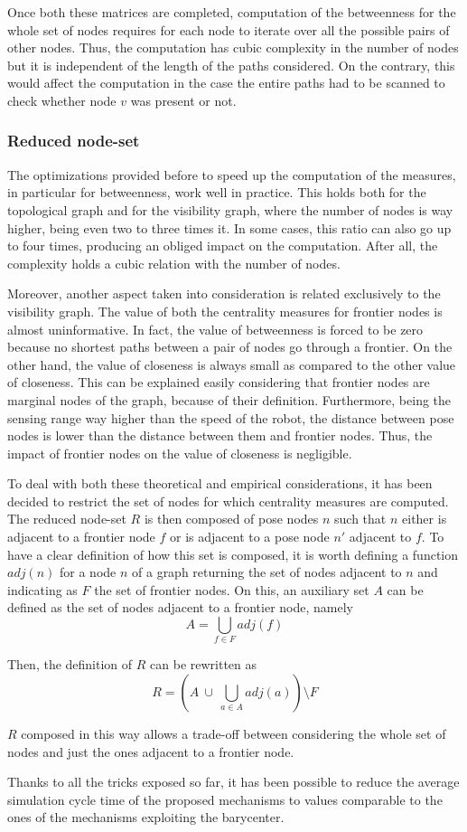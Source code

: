 Once both these matrices are completed, computation of the betweenness
for the whole set of nodes requires for each node to iterate over
all the possible pairs of other nodes. Thus, the computation has cubic
complexity in the number of nodes but it is independent of the length
of the paths considered. On the contrary, this would affect the computation
in the case the entire paths had to be scanned to check whether node
$v$ was present or not.

\subsubsection{Reduced node-set}

The optimizations provided before to speed up the computation of the
measures, in particular for betweenness, work well in practice. This
holds both for the topological graph and for the visibility graph,
where the number of nodes is way higher, being even two to three times
it. In some cases, this ratio can also go up to four times, producing
an obliged impact on the computation. After all, the complexity holds
a cubic relation with the number of nodes. 

Moreover, another aspect taken into consideration is related exclusively
to the visibility graph. The value of both the centrality measures
for frontier nodes is almost uninformative. In fact, the value of
betweenness is forced to be zero because no shortest paths between
a pair of nodes go through a frontier. On the other hand, the value
of closeness is always small as compared to the other value of closeness.
This can be explained easily considering that frontier nodes are marginal
nodes of the graph, because of their definition. Furthermore, being
the sensing range way higher than the speed of the robot, the distance
between pose nodes is lower than the distance between them and frontier
nodes. Thus, the impact of frontier nodes on the value of closeness
is negligible. 

To deal with both these theoretical and empirical considerations,
it has been decided to restrict the set of nodes for which centrality
measures are computed. The reduced node-set $R$ is then composed
of pose nodes $n$ such that $n$ either is adjacent to a frontier
node $f$ or is adjacent to a pose node $n'$ adjacent to $f$. To
have a clear definition of how this set is composed, it is worth defining
a function $adj(n)$ for a node $n$ of a graph returning the set
of nodes adjacent to $n$ and indicating as $F$ the set of frontier
nodes. On this, an auxiliary set $A$ can be defined as the set of
nodes adjacent to a frontier node, namely
\[
A=\bigcup_{f\in F}adj\left(f\right)
\]

Then, the definition of $R$ can be rewritten as 
\[
R=\left(A\:\cup\:\bigcup_{a\in A}adj\left(a\right)\right)\setminus F
\]

$R$ composed in this way allows a trade-off between considering the
whole set of nodes and just the ones adjacent to a frontier node.

Thanks to all the tricks exposed so far, it has been possible to reduce
the average simulation cycle time of the proposed mechanisms to values
comparable to the ones of the mechanisms exploiting the barycenter. 
